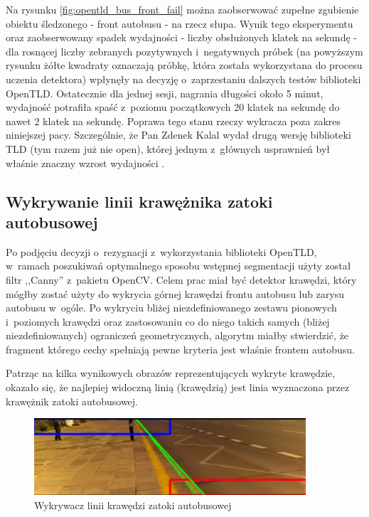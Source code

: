Na rysunku \ref{fig:opentld_bus_front_fail} można zaobserwować 
zupełne zgubienie obiektu 
śledzonego - 
front autobusu - na rzecz słupa. Wynik tego eksperymentu oraz
zaobserwowany spadek wydajności - liczby obsłużonych klatek na sekundę - 
dla rosnącej liczby zebranych pozytywnych i~negatywnych próbek
(na powyższym rysunku żółte kwadraty oznaczają próbkę, która została
wykorzystana do procesu uczenia detektora) 
wpłynęły na decyzję o~zaprzestaniu dalszych testów biblioteki OpenTLD.
Ostatecznie dla jednej sesji,
nagrania długości około 5 minut, wydajność potrafiła spaść z~poziomu
początkowych 20 klatek na sekundę do nawet 2 klatek na sekundę.
Poprawa tego stanu 
rzeczy wykracza poza zakres niniejszej pacy. Szczególnie, że Pan 
Zdenek Kalal wydał drugą wersję biblioteki TLD (tym razem już nie 
open), której jednym z~głównych usprawnień był właśnie znaczny 
wzrost wydajności
\cite{WEB:kalaltld2}.

\subsection{Wykrywanie linii krawężnika zatoki autobusowej}

Po podjęciu decyzji o~rezygnacji
z~wykorzystania
biblioteki OpenTLD, w~ramach poszukiwań optymalnego sposobu wstępnej
segmentacji użyty został filtr ,,Canny'' z~pakietu OpenCV. Celem prac
miał być detektor krawędzi, który mógłby zostać użyty do
wykrycia górnej krawędzi frontu autobusu lub zarysu autobusu w~ogóle.
Po wykryciu bliżej niezdefiniowanego zestawu pionowych i~poziomych
krawędzi oraz zastosowaniu co do niego takich samych (bliżej
niezdefiniowanych) ograniczeń geometrycznych, algorytm miałby
stwierdzić, że fragment którego cechy spełniają pewne kryteria jest
właśnie frontem autobusu.

Patrząc na kilka wynikowych obrazów reprezentujących wykryte krawędzie,
okazało się, że najlepiej 
widoczną linią (krawędzią) jest linia wyznaczona przez krawężnik
zatoki autobusowej.

\begin{figure}[h!]
    \centering
    \includegraphics[width=0.9\textwidth]{img/exp_bus_lane_edge_detector}
    \caption{Wykrywacz linii krawędzi zatoki autobusowej}
    \label{fig:bus_lane_edge_detection}
\end{figure}

